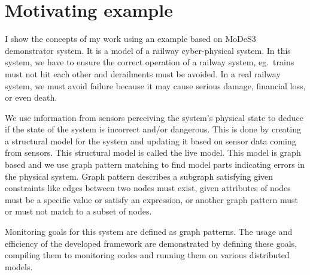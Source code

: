 \chapter{Motivating example}


I show the concepts of my work using an example based on MoDeS3~\cite{modes3} demonstrator system. It is a model of a railway cyber-physical system. In this system, we have to ensure the correct operation of a railway system, eg.\ trains must not hit each other and derailments must be avoided. In a real railway system, we must avoid failure because it may cause serious damage, financial loss, or even death.

We use information from sensors perceiving the system's physical state to deduce if the state of the system is incorrect and/or dangerous. This is done by creating a structural model for the system and updating it based on sensor data coming from sensors. This structural model is called the live model. This model is graph based and we use graph pattern matching to find model parts indicating errors in the physical system. Graph pattern describes a subgraph satisfying given constraints like edges between two nodes must exist, given attributes of nodes must be a specific value or satisfy an expression, or another graph pattern must or must not match to a subset of nodes.

Monitoring goals for this system are defined as graph patterns. The usage and efficiency of the developed framework are demonstrated by defining these goals, compiling them to monitoring codes and running them on various distributed models.

 



